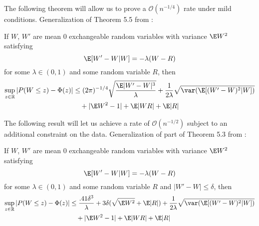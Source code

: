 The following theorem will allow us to prove a $\mathcal{O}(n^{-1/4})$ rate under
mild conditions.  Generalization of Theorem 5.5 from \cite{chen2010normal}:
\begin{theorem}
  \label{T:main}
  If $W$, $W'$ are mean 0 exchangeable random variables with variance
  $\E W^2$
  satisfying
  \begin{equation*}
    \label{eq:13}
    \E[W'-W|W] = -\lambda(W-R)
  \end{equation*}
  for some $\lambda \in (0,1)$ and some random variable $R$, then
  \begin{equation*}
    \begin{split}
      \sup_{z \in \mathbb{R}} |P(W \leq z) - \Phi(z)|
      &\leq (2\pi)^{-1/4} \sqrt{\frac{\E |W'-W|^3}{\lambda}}
      + \frac{1}{2\lambda} \sqrt{\var (\E [(W'-W)^2|W])} \\
      &\quad + |\E W^2 - 1| + \E |WR| + \E |R|
    \end{split}
  \end{equation*}
\end{theorem}

The following result will let us achieve a rate of $\mathcal{O}(n^{-1/2})$ subject to an
additional constraint on the data.  Generalization of part of Theorem 5.3 from \cite{chen2010normal}:
\begin{theorem}
  \label{T:better-rate}
  If $W$, $W'$ are mean 0 exchangeable random variables with variance
  $\E W^2$
  satisfying
  \begin{equation*}
    \E[W'-W|W] = -\lambda(W-R)
  \end{equation*}
  for some $\lambda \in (0,1)$ and some random variable $R$ and $|W'-W| \leq \delta$, then
  \begin{equation*}
    \begin{split}
      \sup_{z \in \mathbb{R}} |P(W \leq z) - \Phi(z)|
      &\leq \frac{.41 \delta^3}{\lambda} + 3 \delta (\sqrt{\E W^2} + \E |R|)
      + \frac{1}{2\lambda} \sqrt{\var (\E [(W'-W)^2|W])} \\
      &\quad + |\E W^2 - 1| + \E |WR| + \E |R|
    \end{split}
  \end{equation*}
\end{theorem}
